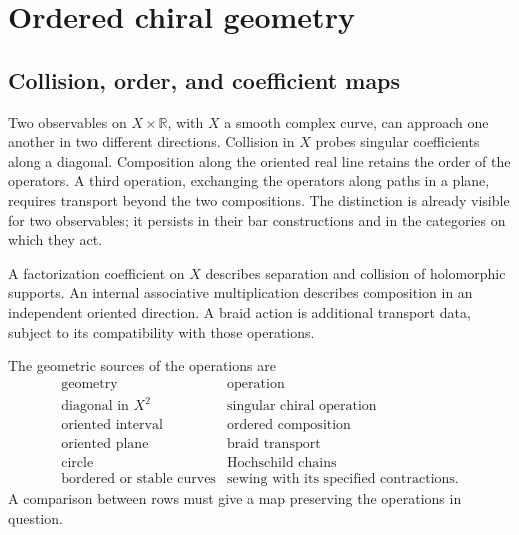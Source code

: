 \part{Ordered chiral geometry}
\chapter{Collision, order, and coefficient maps}

Two observables on $X\times\mathbb R$, with $X$ a smooth complex curve,
can approach one another in two different directions.
Collision in $X$ probes singular coefficients along a diagonal.
Composition along the oriented real line retains the order of the operators.
A third operation, exchanging the operators along paths in a plane,
requires transport beyond the two compositions.
The distinction is already visible for two observables; it persists in their
bar constructions and in the categories on which they act.

\begin{principle}
A factorization coefficient on $X$ describes separation and collision of
holomorphic supports. An internal associative multiplication describes
composition in an independent oriented direction. A braid action is additional
transport data, subject to its compatibility with those operations.
\end{principle}

The geometric sources of the operations are
\[
\begin{array}{c|c}
\text{geometry}&\text{operation}\\\hline
\text{diagonal in }X^2&\text{singular chiral operation}\\
\text{oriented interval}&\text{ordered composition}\\
\text{oriented plane}&\text{braid transport}\\
\text{circle}&\text{Hochschild chains}\\
\text{bordered or stable curves}&\text{sewing with its specified contractions}.
\end{array}
\]
A comparison between rows must give a map preserving the operations in question.

